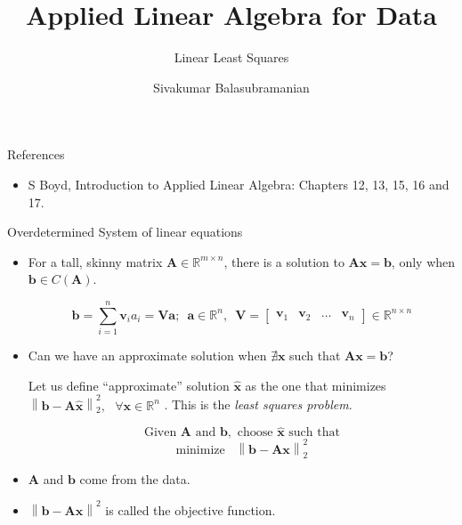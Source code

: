 \documentclass[aspectratio=169]{beamer}
\title{Applied Linear Algebra for Data}
\subtitle{Linear Least Squares}
\author{Sivakumar Balasubramanian}
\institute[Christian Medical College] %
{
  \inst{}%
  Department of Bioengineering\\
  Christian Medical College, Bagayam\\
  Vellore 632002
}
\date{}
\begin{document}


\begin{frame}
  \titlepage
\end{frame}

\begin{frame}[t]{References}
\begin{itemize}
    \item S Boyd, Introduction to Applied Linear Algebra: Chapters 12, 13, 15, 16 and 17. 
\end{itemize} 
\end{frame}


\begin{frame}[t]{Overdetermined System of linear equations}
\begin{itemize}
\item For a tall, skinny matrix $\mathbf{A} \in \mathbb{R}^{m \times n}$, there is a solution to $\mathbf{Ax} = \mathbf{b}$, only when $\mathbf{b} \in C\left(\mathbf{A}\right)$.

\[ \mathbf{b} = \sum_{i=1}^{n} \mathbf{v}_i a_i = \mathbf{V}\mathbf{a}; \,\,\, \mathbf{a} \in \mathbb{R}^n, \,\,\, \mathbf{V} = \begin{bmatrix*}\mathbf{v}_1 & \mathbf{v}_2 & \ldots & \mathbf{v}_n\end{bmatrix*} \in \mathbb{R}^{n \times n} \]

\item Can we have an approximate solution when $\nexists \mathbf{x}$ such that $\mathbf{Ax} = \mathbf{b}$?

Let us define ``approximate'' solution $\hat{\mathbf{x}}$ as the one that minimizes $\left\lVert \mathbf{b} - \mathbf{A}\hat{\mathbf{x}}\right\rVert_2^2, \,\,\,\, \forall \mathbf{x} \in \mathbb{R}^n$ . This is the \textit{least squares problem}.

\[ \text{Given } \mathbf{A} \text{ and } \mathbf{b}, \text{ choose } \hat{\mathbf{x}} \text{ such that} \] \[ \text{minimize }\,\,\, \left\lVert \mathbf{b} - \mathbf{Ax}\right\rVert_2^2 \]

\item $\mathbf{A}$ and $\mathbf{b}$ come from the data.

\item $\left\lVert \mathbf{b} - \mathbf{Ax}\right\rVert^2$ is called the objective function.
\end{itemize}
\end{frame}
\end{document}
